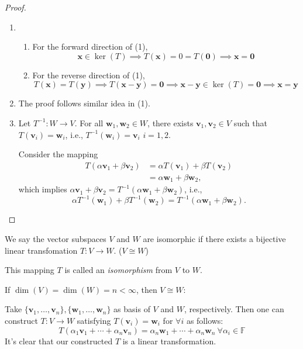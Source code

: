 \begin{proof}
\begin{enumerate}
\item
\begin{enumerate}
\item

For the forward direction of (1),
\[
\bm x\in\ker(T)\implies
T(\bm x)=0=T(\bm0)\implies
\bm x=\bm0
\]
\item

For the reverse direction of (1),
\[
T(\bm x)=T(\bm y)\implies
T(\bm x-\bm y)=\bm0\implies
\bm x-\bm y\in\ker(T)=\bm0
\implies
\bm x=\bm y
\]

\end{enumerate}

\item
The proof follows similar idea in (1).

\item
Let $T^{-1}:W\to V$. 
For all $\bm w_1,\bm w_2\in W$, 
there exists $\bm v_1,\bm v_2\in V$ such that 
$T(\bm v_i)=\bm w_i$, i.e., $T^{-1}(\bm w_i)=\bm v_i$ $i=1,2$.

Consider the mapping
\begin{align*}
T(\alpha\bm v_1+\beta\bm v_2)&=\alpha T(\bm v_1)+\beta T(\bm v_2)\\
&=\alpha\bm w_1+\beta\bm w_2,
\end{align*}
which implies $\alpha\bm v_1+\beta\bm v_2=T^{-1}(\alpha\bm w_1+\beta\bm w_2)$, i.e.,
\[
\alpha T^{-1}(\bm w_1)+\beta T^{-1}(\bm w_2)
=
T^{-1}(\alpha\bm w_1+\beta\bm w_2).
\]
\end{enumerate}
\end{proof}



\begin{definition}[isomorphism]

We say the vector subspaces $V$ and $W$ are isomorphic 
if there exists a bijective linear transfomation $T:V\to W$. ($V\cong W$)

This mapping $T$ is called an \emph{isomorphism} from $V$ to $W$.
\end{definition}

\begin{remark}
If $\dim(V)=\dim(W)=n<\infty$, then $V\cong W$:

Take $\{\bm v_1,\dots,\bm v_n\},\{\bm w_1,\dots,\bm w_n\}$ as basis of $V$ and $W$, respectively. Then one can construct $T:V\to W$ satisfying $T(\bm v_i)=\bm w_i$ for $\forall i$ as follows:
\[
T(\alpha_1\bm v_1+\cdots+\alpha_n\bm v_n)
=
\alpha_n\bm w_1+\cdots+\alpha_n\bm w_n\
\forall\alpha_i\in\mathbb{F}
\]
It's clear that our constructed $T$ is a linear transformation.
\end{remark}

